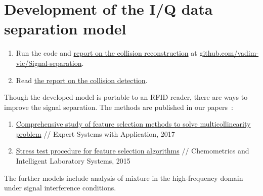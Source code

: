 \documentclass[12pt]{article}
\begin{document}
\section{Development of the I/Q data separation model}
\begin{enumerate}
\item Run the code and \href{https://github.com/vadim-vic/Signal-separation}{report on the collision reconstruction} at \href{https://github.com/vadim-vic/Signal-separation}{github.com/vadim-vic/Signal-separation}. 
\item Read \href{https://github.com/vadim-vic/Signal-separation/blob/main/latex/CollisionDetector.pdf}{the report on the collision detection}.
\end{enumerate}

Though the developed model is portable to an RFID reader, there are ways to improve the signal separation. The methods are published in our papers~\cite{Katrutsa2017,Katrutsa2015}:
\begin{enumerate}
\item \href{https://doi.org/10.1016/j.eswa.2017.01.048}{Comprehensive study of feature selection methods to solve multicollinearity problem} // Expert Systems with Application, 2017
\item \href{https://doi.org/10.1016/j.chemolab.2015.01.018}{Stress test procedure for feature selection algorithms} // Chemometrics and Intelligent Laboratory Systems, 2015
\end{enumerate}

The further models include analysis of mixture in the high-frequency domain under signal interference conditions.



\end{document}
